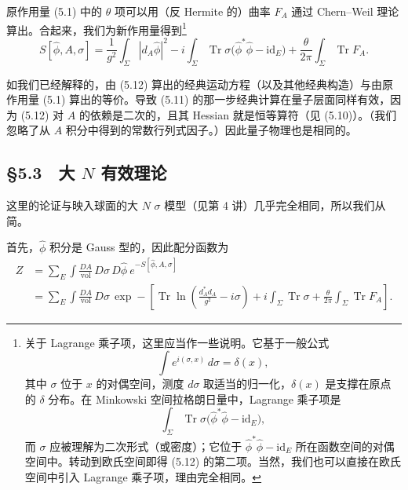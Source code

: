 原作用量 (5.1) 中的 $\theta$ 项可以用（反 Hermite 的）曲率 $F_A$ 通过 Chern–Weil 理论算出。合起来，我们为新作用量得到\footnote{关于 Lagrange 乘子项，这里应当作一些说明。它基于一般公式
\[
  \int e^{i(\sigma,x)}\,d\sigma=\delta(x),
\]
其中 $\sigma$ 位于 $x$ 的对偶空间，测度 $d\sigma$ 取适当的归一化，$\delta(x)$ 是支撑在原点的 $\delta$ 分布。在 Minkowski 空间拉格朗日量中，Lagrange 乘子项是
\[
  \int_\Sigma\operatorname{Tr}\sigma\bigl(\hat\phi^*\hat\phi-\mathrm{id}_E\bigr),
\]
而 $\sigma$ 应被理解为二次形式（或密度）；它位于 $\hat\phi^*\hat\phi-\mathrm{id}_E$ 所在函数空间的对偶空间中。转动到欧氏空间即得 (5.12) 的第二项。当然，我们也可以直接在欧氏空间中引入 Lagrange 乘子项，理由完全相同。}
\begin{equation}
  \tag{5.12}
  \label{eq:5-12}
  S[\hat\phi,A,\sigma]=\frac{1}{g^2}\int_\Sigma|d_A\hat\phi|^2-i\int_\Sigma\operatorname{Tr}\sigma\bigl(\hat\phi^*\hat\phi-\mathrm{id}_E\bigr)+\frac{\theta}{2\pi}\int_\Sigma\operatorname{Tr}F_A .
\end{equation}

如我们已经解释的，由 (5.12) 算出的经典运动方程（以及其他经典构造）与由原作用量 (5.1) 算出的等价。导致 (5.11) 的那一步经典计算在量子层面同样有效，因为 (5.12) 对 $A$ 的依赖是二次的，且其 Hessian 就是恒等算符（见 (5.10)）。（我们忽略了从 $A$ 积分中得到的常数行列式因子。）因此量子物理也是相同的。


\subsection*{§5.3　大 $N$ 有效理论}

这里的论证与映入球面的大 $N$ $\sigma$ 模型（见第 4 讲）几乎完全相同，所以我们从简。

首先，$\hat\phi$ 积分是 Gauss 型的，因此配分函数为
\begin{equation}
  \tag{5.13}
  \label{eq:5-13}
  \begin{aligned}
    Z&=\sum_E\int\frac{DA}{\mathrm{vol}}\,D\sigma\,D\hat\phi\ e^{-S[\hat\phi,A,\sigma]}\\
    &=\sum_E\int\frac{DA}{\mathrm{vol}}\,D\sigma\,\exp-\left[\operatorname{Tr}\ln\left(\frac{d_A^*d_A}{g^2}-i\sigma\right)+i\int_\Sigma\operatorname{Tr}\sigma+\frac{\theta}{2\pi}\int_\Sigma\operatorname{Tr}F_A\right].
  \end{aligned}
\end{equation}

